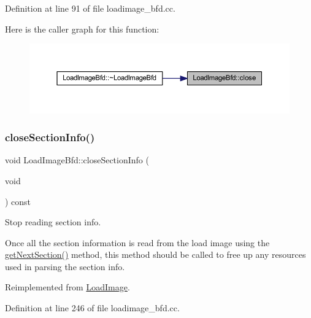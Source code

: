 Definition at line 91 of file loadimage\+\_\+bfd.\+cc.

Here is the caller graph for this function\+:
\nopagebreak
\begin{figure}[H]
\begin{center}
\leavevmode
\includegraphics[width=350pt]{class_load_image_bfd_af0297020340300588572090ae50ff145_icgraph}
\end{center}
\end{figure}
\mbox{\label{class_load_image_bfd_ab09105d243f255c2bece8d27803cb4c5}} 
\subsubsection{\texorpdfstring{closeSectionInfo()}{closeSectionInfo()}}
{\footnotesize\ttfamily void Load\+Image\+Bfd\+::close\+Section\+Info (\begin{DoxyParamCaption}\item[{void}]{ }\end{DoxyParamCaption}) const\hspace{0.3cm}{\ttfamily [virtual]}}



Stop reading section info. 

Once all the section information is read from the load image using the \mbox{\hyperlink{class_load_image_bfd_aaae78fac403213f2dc9ebf97ac28a5b2}{get\+Next\+Section()}} method, this method should be called to free up any resources used in parsing the section info. 

Reimplemented from \mbox{\hyperlink{class_load_image_a6358439b2aaef7497dad384b7c43213f}{Load\+Image}}.



Definition at line 246 of file loadimage\+\_\+bfd.\+cc.

\mbox{\label{class_load_image_bfd_aaf25ff18d5cec7300dcd28ca4150b8ce}} 

